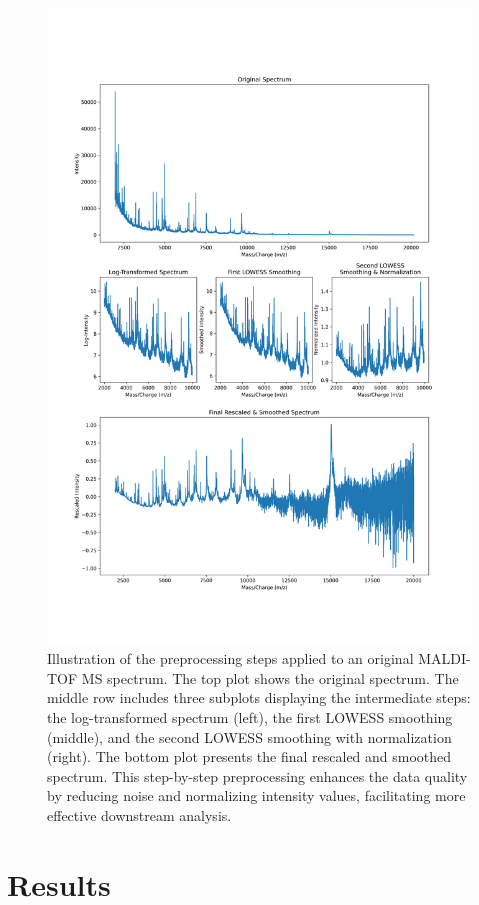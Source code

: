 \documentclass[english,11pt,a4paper,titlepage]{article}
\begin{document}
	\begin{figure}[h]
		\centering
		\includegraphics[width=0.9\linewidth]{img/preprocessing_steps_combined.png}
		\caption{Illustration of the preprocessing steps applied to an original MALDI-TOF MS spectrum. The top plot shows the original spectrum. The middle row includes three subplots displaying the intermediate steps: the log-transformed spectrum (left), the first LOWESS smoothing (middle), and the second LOWESS smoothing with normalization (right). The bottom plot presents the final rescaled and smoothed spectrum. This step-by-step preprocessing enhances the data quality by reducing noise and normalizing intensity values, facilitating more effective downstream analysis.}
		\label{fig:preprocessing_steps}
	\end{figure}
	\clearpage


\section*{Results}
\end{document}

